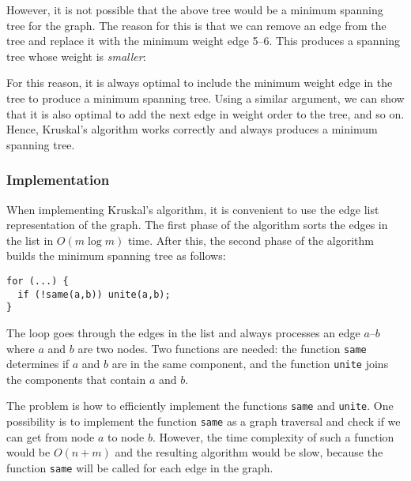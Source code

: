 However, it is not possible that the above tree
would be a minimum spanning tree for the graph.
The reason for this is that we can remove an edge
from the tree and replace it with the minimum weight edge 5--6.
This produces a spanning tree whose weight is
\emph{smaller}:

\begin{center}
\end{center}

For this reason, it is always optimal
to include the minimum weight edge
in the tree to produce a minimum spanning tree.
Using a similar argument, we can show that it
is also optimal to add the next edge in weight order
to the tree, and so on.
Hence, Kruskal's algorithm works correctly and
always produces a minimum spanning tree.

\subsubsection{Implementation}

When implementing Kruskal's algorithm,
it is convenient to use
the edge list representation of the graph.
The first phase of the algorithm sorts the
edges in the list in $O(m \log m)$ time.
After this, the second phase of the algorithm
builds the minimum spanning tree as follows:

\begin{lstlisting}
for (...) {
  if (!same(a,b)) unite(a,b);
}
\end{lstlisting}

The loop goes through the edges in the list
and always processes an edge $a$--$b$
where $a$ and $b$ are two nodes.
Two functions are needed:
the function \texttt{same} determines
if $a$ and $b$ are in the same component,
and the function \texttt{unite}
joins the components that contain $a$ and $b$.

The problem is how to efficiently implement
the functions \texttt{same} and \texttt{unite}.
One possibility is to implement the function
\texttt{same} as a graph traversal and check if
we can get from node $a$ to node $b$.
However, the time complexity of such a function
would be $O(n+m)$
and the resulting algorithm would be slow,
because the function \texttt{same} will be called for each edge in the graph.

